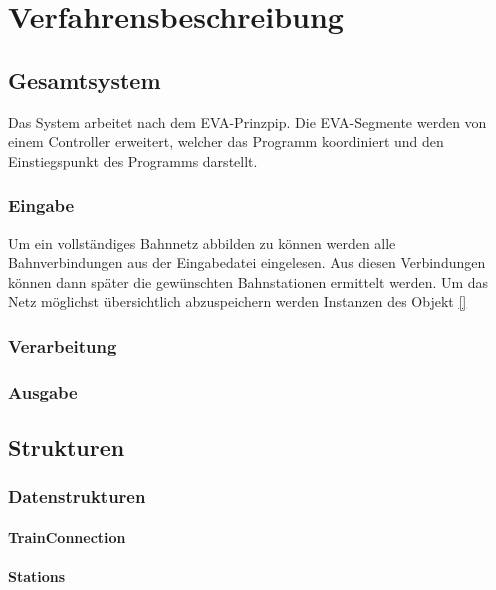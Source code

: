 \chapter{Verfahrensbeschreibung}\label{ch:verfahrensbeschreibung}


\section{Gesamtsystem}\label{ver:sec:gesamtsystem}
Das System arbeitet nach dem EVA-Prinzpip. Die EVA-Segmente werden von einem Controller erweitert, welcher das Programm koordiniert und den Einstiegspunkt des Programms darstellt.

\subsection{Eingabe}\label{ver:subsec:eingabe}
Um ein vollständiges Bahnnetz abbilden zu können werden alle Bahnverbindungen aus der Eingabedatei eingelesen. Aus diesen Verbindungen können dann später die gewünschten Bahnstationen ermittelt werden. Um das Netz möglichst übersichtlich abzuspeichern werden Instanzen des Objekt \ref{}\\


\subsection{Verarbeitung}\label{subsec:verarbeitung}
\subsection{Ausgabe}\label{ver:subsec:ausgabe}

\section{Strukturen}\label{ver:sec:strukturen}
\subsection{Datenstrukturen}\label{ver:subsec:datenstrukt}
\subsubsection{TrainConnection}\label{ver:subsubsec:trainconnection}
\subsubsection{Stations}\label{ver:subsubsec:stations}
